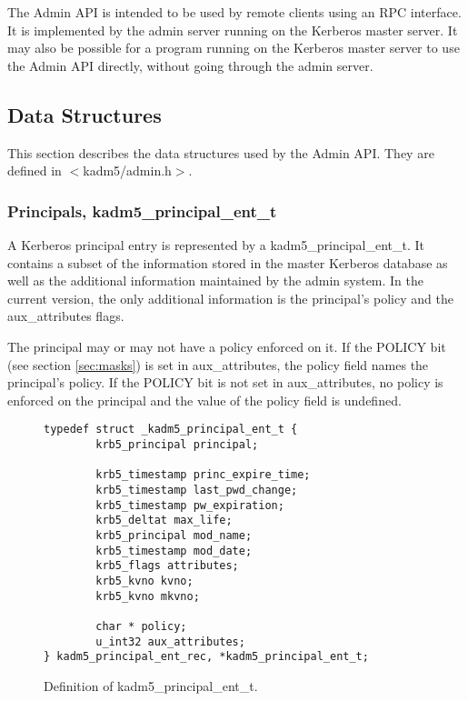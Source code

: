 The Admin API is intended to be used by remote clients using an RPC
interface.  It is implemented by the admin server running on the
Kerberos master server.  It may also be possible for a program running
on the Kerberos master server to use the Admin API directly, without
going through the admin server.

\subsection{Data Structures}

This section describes the data structures used by the Admin API.
They are defined in $<$kadm5/admin.h$>$.

\subsubsection{Principals, kadm5_principal_ent_t}
\label{sec:principal-structure}

A Kerberos principal entry is represented by a kadm5_principal_ent_t.
It contains a subset of the information stored in the master Kerberos
database as well as the additional information maintained by the admin
system.  In the current version, the only additional information is
the principal's policy and the aux_attributes flags.

The principal may or may not have a policy enforced on it.  If the
POLICY bit (see section \ref{sec:masks}) is set in aux_attributes, the
policy field names the principal's policy.  If the POLICY bit is not
set in aux_attributes, no policy is enforced on the principal and the
value of the policy field is undefined.

\begin{figure}[htbp]
\begin{verbatim}
typedef struct _kadm5_principal_ent_t {
        krb5_principal principal;

        krb5_timestamp princ_expire_time;
        krb5_timestamp last_pwd_change;
        krb5_timestamp pw_expiration;
        krb5_deltat max_life;
        krb5_principal mod_name;
        krb5_timestamp mod_date;
        krb5_flags attributes;
        krb5_kvno kvno;
        krb5_kvno mkvno;

        char * policy;
        u_int32 aux_attributes;
} kadm5_principal_ent_rec, *kadm5_principal_ent_t;
\end{verbatim}
\caption{Definition of kadm5_principal_ent_t.}
\label{fig:princ-t}
\end{figure}


